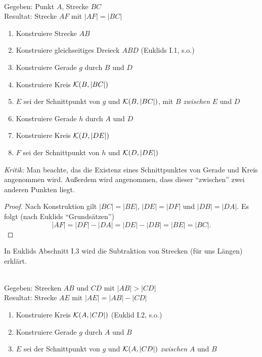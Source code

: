 \begin{konst}\ \\
    Gegeben: Punkt $A$, Strecke $BC$ \\
    Resultat: Strecke $AF$ mit $|AF|=|BC|$
    \renewcommand{\labelenumi}{\arabic{enumi}.} %
    \begin{enumerate}
        \item Konstruiere Strecke $AB$
        \item Konstruiere gleichseitiges Dreieck $ABD$ (Euklids I.1, s.o.)
        \item Konstruiere Gerade $g$ durch $B$ und $D$
        \item Konstruiere Kreis ${\mathcal K}(B,|BC|)$
        \item $E$ sei der Schnittpunkt von $g$ und ${\mathcal K}(B,|BC|)$, mit $B$ {\em zwischen} $E$ und $D$
        \item Konstruiere Gerade $h$ durch $A$ und $D$
        \item Konstruiere Kreis ${\mathcal K}(D,|DE|)$
        \item $F$ sei der Schnittpunkt von $h$ und ${\mathcal K}(D,|DE|)$
    \end{enumerate}
\end{konst}

{\em Kritik:} Man beachte, das die Existenz eines Schnittpunktes von Gerade und Kreis angenommen
wird. Außerdem wird angenommen, dass dieser "`zwischen"' zwei anderen Punkten liegt.

\begin{proof}
    Nach Konstruktion gilt $|BC|=|BE|$, $|DE|=|DF|$ und $|DB|=|DA|$.
    Es folgt (nach Euklids "`Grundsätzen"')
    $$
        |AF|=|DF|-|DA|= |DE|-|DB| = |BE| = |BC|.
    $$
\end{proof}


In Euklids Abschnitt I.3 wird die Subtraktion von Strecken (für uns Längen) erklärt.

\begin{konst}\ \\
    Gegeben: Strecken $AB$ und $CD$ mit  $|AB| > |CD|$ \\
    Resultat: Strecke $AE$ mit $|AE|=|AB|-|CD|$
    \renewcommand{\labelenumi}{\arabic{enumi}.} %
    \begin{enumerate}
        \item Konstruiere Kreis ${\mathcal K}(A,|CD|)$ (Euklid I.2, s.o.)
        \item Konstruiere Gerade $g$ durch $A$ und $B$
        \item $E$ sei der Schnittpunkt von $g$ und ${\mathcal K}(A,|CD|)$ {\em zwischen} $A$ und $B$
    \end{enumerate}
\end{konst}

